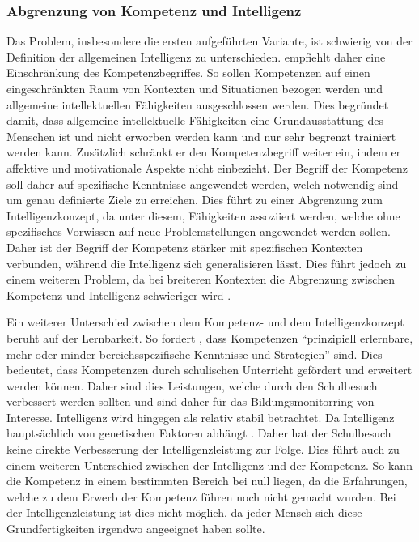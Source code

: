 \subsubsection*{Abgrenzung von Kompetenz und Intelligenz}
Das Problem, insbesondere die ersten aufgeführten Variante, ist schwierig von der Definition der allgemeinen Intelligenz zu unterschieden. \citet{Weinert2001b} empfiehlt daher eine Einschränkung des Kompetenzbegriffes. So sollen Kompetenzen auf einen eingeschränkten Raum von Kontexten und Situationen bezogen werden und allgemeine intellektuellen Fähigkeiten ausgeschlossen werden. Dies begründet \citet{Weinert2001b} damit, dass allgemeine intellektuelle Fähigkeiten eine Grundausstattung des Menschen ist und nicht erworben werden kann und nur sehr begrenzt trainiert werden kann. Zusätzlich schränkt er den Kompetenzbegriff weiter ein, indem er affektive und motivationale Aspekte nicht einbezieht. Der Begriff der Kompetenz soll daher auf spezifische Kenntnisse angewendet werden, welch notwendig sind um genau definierte Ziele zu erreichen. Dies führt zu einer Abgrenzung zum Intelligenzkonzept, da unter diesem, Fähigkeiten assoziiert werden, welche ohne spezifisches Vorwissen auf neue Problemstellungen angewendet werden sollen. Daher ist der Begriff der Kompetenz stärker mit spezifischen Kontexten verbunden, während die Intelligenz sich generalisieren lässt. Dies führt jedoch zu einem weiteren Problem, da bei breiteren Kontexten die Abgrenzung zwischen Kompetenz und Intelligenz schwieriger wird \citep{Hartig2006}.


Ein weiterer Unterschied zwischen dem Kompetenz- und dem Intelligenzkonzept beruht auf der Lernbarkeit. So fordert \citet[S. 22]{Baumert2001}, dass Kompetenzen "`prinzipiell erlernbare, mehr oder minder bereichsspezifische Kenntnisse und Strategien"' sind. Dies bedeutet, dass Kompetenzen durch schulischen Unterricht gefördert und erweitert werden können. Daher sind dies Leistungen, welche durch den Schulbesuch verbessert werden sollten und sind daher für das Bildungsmonitorring von Interesse. Intelligenz wird hingegen als relativ stabil betrachtet. Da Intelligenz hauptsächlich von genetischen Faktoren abhängt \citep{Shakeshaft2013}. Daher hat der Schulbesuch keine direkte Verbesserung der Intelligenzleistung zur Folge. Dies führt auch zu einem weiteren Unterschied zwischen der Intelligenz und der Kompetenz. So kann die Kompetenz in einem bestimmten Bereich bei null liegen, da die Erfahrungen, welche zu dem Erwerb der Kompetenz führen noch nicht gemacht wurden. Bei der Intelligenzleistung ist dies nicht möglich, da jeder Mensch sich diese Grundfertigkeiten irgendwo angeeignet haben sollte.


